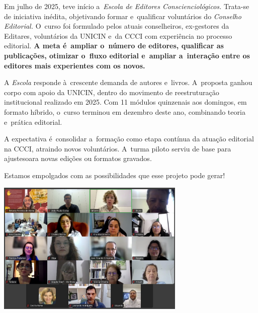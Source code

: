 \documentclass{gescons}
\begin{document}
    \begin{multicols}{2}


Em julho de 2025, teve início a~\emph{Escola de Editores Conscienciológicos.} Trata-se de iniciativa inédita, objetivando formar e~qualificar voluntários do \emph{Conselho Editorial.} O~curso foi formulado pelos atuais conselheiros, ex-gestores da Editares, voluntários da UNICIN e~da CCCI com experiência no processo editorial. \textbf{A meta é~ampliar o~número de editores, qualificar as publicações, otimizar o~fluxo editorial e~ampliar a~interação entre os editores mais experientes com os novos.}

A \emph{Escola} responde à~crescente demanda de autores e~livros. A~proposta ganhou corpo com apoio da UNICIN, dentro do movimento de reestruturação institucional realizado em 2025. Com 11 módulos quinzenais aos domingos, em formato híbrido, o~curso terminou em dezembro deste ano, combinando teoria e~prática editorial.

A expectativa é~consolidar a~formação como etapa contínua da atuação editorial na CCCI, atraindo novos voluntários. A~turma piloto serviu de base para ajustesoara novas edições ou formatos gravados.

Estamos empolgados com as possibilidades que esse projeto pode gerar!


\begin{center}
    \includegraphics[width=9cm]{articles/atualizacoes/fotos/escola-editores/escola-editores1.jpeg} 
\end{center}


    \end{multicols}
\end{document}
